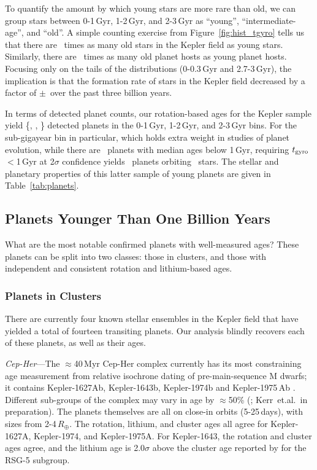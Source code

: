 \documentclass[11pt,twocolumn,tighten]{aastex63}
\begin{document}
To quantify the amount by which young stars are more rare than old, we
can group stars between 0-1\,Gyr, 1-2\,Gyr, and 2-3\,Gyr as ``young'',
``intermediate-age'', and ``old''.  A simple counting exercise from
Figure~\ref{fig:hist_tgyro} tells us that there are \ratioobtoybstars\
times as many old stars in the Kepler field as young stars.
Similarly, there are \ratioobtoybplanets\ times as many old planet
hosts as young planet hosts.  Focusing only on the tails of the
distributions (0-0.3\,Gyr and 2.7-3\,Gyr), the implication is that the
formation rate of stars in the Kepler field decreased by a factor of
\ratiosfr$\pm$\uncratiosfr\ over the past three billion years.

In terms of detected planet counts, our rotation-based ages for the
Kepler sample yield \{\nplyounggyro, \nplmidgyro, \nploldgyro\}
detected planets in the 0-1\,Gyr, 1-2\,Gyr, and 2-3\,Gyr bins.  For
the sub-gigayear bin in particular, which holds extra weight in
studies of planet evolution, while there are \nplyounggyro\ planets
with median ages below 1\,Gyr, requiring $t_{\rm gyro}$$<$1\,Gyr at
2$\sigma$ confidence yields \nplyounggyrotwosigma\ planets orbiting
\nplhostsyounggyrotwosigma\ stars.  The stellar and planetary
properties of this latter sample of young planets are given in
Table~\ref{tab:planets}.


\subsection{Planets Younger Than One Billion Years}

What are the most notable confirmed planets with well-measured ages?
These planets can be split into two classes: those in clusters, and
those with independent and consistent rotation and lithium-based ages.

\subsubsection{Planets in Clusters}
\label{subsec:clusterplanets}

There are currently four known stellar ensembles in the Kepler field
that have yielded a total of fourteen transiting planets.  Our
analysis blindly recovers each of these planets, as well as their
ages.

{\it Cep-Her}---The $\approx$40\,Myr Cep-Her complex currently has its
most constraining age measurement from relative isochrone dating of
pre-main-sequence M dwarfs; it contains Kepler-1627Ab, Kepler-1643b,
Kepler-1974b and Kepler-1975\,Ab \citep{Bouma_2022a,Bouma_2022b}.
Different sub-groups of the complex may vary in age by $\approx$50\%
(\citealt{Bouma_2022b}; Kerr~et.al.~in preparation).  The planets
themselves are all on close-in orbits (5-25\,days), with sizes from
2-4\,$R_\oplus$.  The rotation, lithium, and cluster ages all agree
for Kepler-1627A, Kepler-1974, and Kepler-1975A.  For Kepler-1643, the
rotation and cluster ages agree, and the lithium age is 2.0$\sigma$
above the cluster age reported by \citet{Bouma_2022b} for the RSG-5
subgroup.
\end{document}
